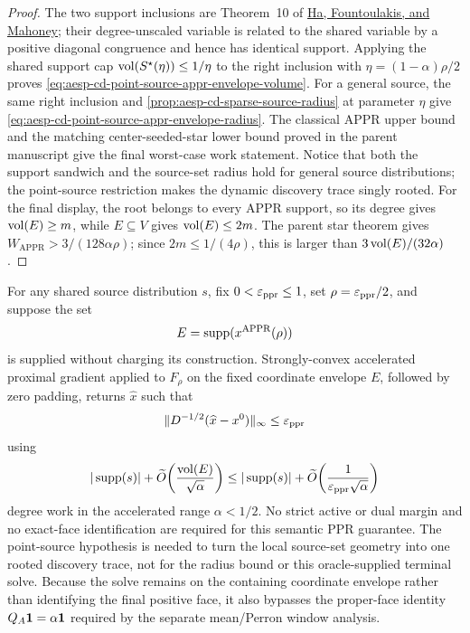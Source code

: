 \begin{proof}
The two support inclusions are Theorem~10 of
\href{https://jmlr.csail.mit.edu/papers/volume22/20-029/20-029.pdf}{Ha,
Fountoulakis, and Mahoney}; their degree-unscaled variable is related to the
shared variable by a positive diagonal congruence and hence has identical
support.  Applying the shared support cap
\(\operatorname{vol}(S^\star(\eta))\leq1/\eta\) to the right inclusion with
\(\eta=(1-\alpha)\rho/2\) proves
\cref{eq:aesp-cd-point-source-appr-envelope-volume}.  For a general source,
the same right inclusion and \cref{prop:aesp-cd-sparse-source-radius} at
parameter \(\eta\) give
\cref{eq:aesp-cd-point-source-appr-envelope-radius}.  The classical APPR
upper bound and the matching center-seeded-star lower bound proved in the
parent manuscript give the final worst-case work statement.  Notice that
both the support sandwich and the source-set radius hold for general source
distributions; the point-source restriction makes the dynamic discovery
trace singly rooted.  For the final display, the root belongs to every APPR
support, so its degree gives \(\operatorname{vol}(E)\geq m\), while \(E\subseteq V\) gives
\(\operatorname{vol}(E)\leq2m\).  The parent star theorem gives
\(W_{\mathrm{APPR}}>3/(128\alpha\rho)\); since
\(2m\leq1/(4\rho)\), this is larger than
\(3\operatorname{vol}(E)/(32\alpha)\).
\end{proof}

\begin{corollary}
\label{cor:aesp-cd-point-source-appr-envelope-oracle}
\label{cor:aesp-cd-appr-envelope-oracle}
For any shared source distribution \(s\), fix \(0<\varepsilon_{\mathrm{ppr}}\leq1\), set
\(\rho=\varepsilon_{\mathrm{ppr}}/2\), and suppose the set
\begin{equation*}
 E=\operatorname{supp}(x^{\mathrm{APPR}}(\rho))
\end{equation*}
is supplied without charging its construction.  Strongly-convex accelerated
proximal gradient applied to \(F_\rho\) on the fixed coordinate envelope
\(E\), followed by zero padding, returns \(\widehat x\) such that
\begin{equation}
 \lVert D^{-1/2}(\widehat x-x^0)\rVert_\infty\leq\varepsilon_{\mathrm{ppr}}
 \label{eq:aesp-cd-point-source-appr-envelope-oracle-error}
\end{equation}
using
\begin{equation}
 |\operatorname{supp}(s)|+\widetilde O\!\left(
  \frac{\operatorname{vol}(E)}{\sqrt\alpha}
 \right)
 \leq
 |\operatorname{supp}(s)|+\widetilde O\!\left(
  \frac1{\varepsilon_{\mathrm{ppr}}\sqrt\alpha}
 \right)
 \label{eq:aesp-cd-point-source-appr-envelope-oracle-work}
\end{equation}
degree work in the accelerated range \(\alpha<1/2\).  No strict active or
dual margin and no exact-face identification are required for this semantic
PPR guarantee.  The point-source hypothesis is needed to turn the local
source-set geometry into one rooted discovery trace, not for the radius
bound or this oracle-supplied terminal solve.  Because the solve remains on
the containing coordinate envelope rather than identifying the final positive
face, it also bypasses the proper-face identity
$Q_A\mathbf{1}=\alpha\mathbf{1}$ required by the separate mean/Perron window analysis.
\end{corollary}

